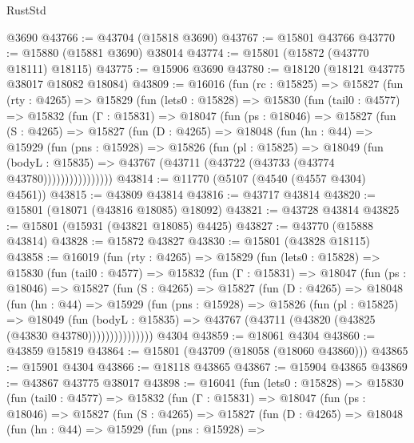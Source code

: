 \begin{lexlean}{RustStd}
\begin{coremodule}
    @3690
@43766 := @43704 (@15818 @3690)
@43767 := @15801 @43766
@43770 := @15880 (@15881 @3690) @38014
@43774 := @15801 (@15872 (@43770 @18111) @18115)
@43775 := @15906 @3690
@43780 := @18120 (@18121 @43775 @38017 @18082 @18084)
@43809 := @16016
    (fun (rc : @15825) =>
    @15827
      (fun (rty : @4265) =>
      @15829
        (fun (lets0 : @15828) =>
        @15830
          (fun (tail0 : @4577) =>
          @15832
            (fun (Γ : @15831) =>
            @18047
              (fun (ps : @18046) =>
              @15827
                (fun (S : @4265) =>
                @15827
                  (fun (D : @4265) =>
                  @18048
                    (fun (hn : @44) =>
                    @15929
                      (fun (pns : @15928) =>
                      @15826
                        (fun (pl : @15825) =>
                        @18049
                          (fun (bodyL : @15835) =>
                          @43767 (@43711 (@43722 (@43733 (@43774 @43780))))))))))))))))
@43814 := @11770 (@5107 (@4540 (@4557 @4304) @4561))
@43815 := @43809 @43814
@43816 := @43717 @43814
@43820 := @15801 (@18071 (@43816 @18085) @18092)
@43821 := @43728 @43814
@43825 := @15801 (@15931 (@43821 @18085) @4425)
@43827 := @43770 (@15888 @43814)
@43828 := @15872 @43827
@43830 := @15801 (@43828 @18115)
@43858 := @16019
    (fun (rty : @4265) =>
    @15829
      (fun (lets0 : @15828) =>
      @15830
        (fun (tail0 : @4577) =>
        @15832
          (fun (Γ : @15831) =>
          @18047
            (fun (ps : @18046) =>
            @15827
              (fun (S : @4265) =>
              @15827
                (fun (D : @4265) =>
                @18048
                  (fun (hn : @44) =>
                  @15929
                    (fun (pns : @15928) =>
                    @15826
                      (fun (pl : @15825) =>
                      @18049
                        (fun (bodyL : @15835) =>
                        @43767 (@43711 (@43820 (@43825 (@43830 @43780)))))))))))))))
    @4304
@43859 := @18061 @4304
@43860 := @43859 @15819
@43864 := @15801 (@43709 (@18058 (@18060 @43860)))
@43865 := @15901 @4304
@43866 := @18118 @43865
@43867 := @15904 @43865
@43869 := @43867 @43775 @38017
@43898 := @16041
    (fun (lets0 : @15828) =>
    @15830
      (fun (tail0 : @4577) =>
      @15832
        (fun (Γ : @15831) =>
        @18047
          (fun (ps : @18046) =>
          @15827
            (fun (S : @4265) =>
            @15827
              (fun (D : @4265) =>
              @18048
                (fun (hn : @44) =>
                @15929
                  (fun (pns : @15928) =>

\end{coremodule}
\end{lexlean}
